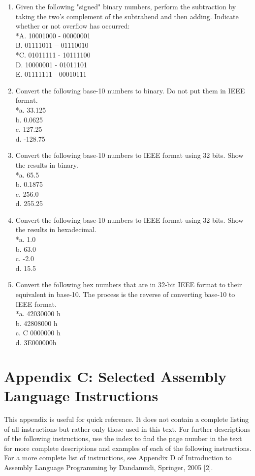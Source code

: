 \documentclass[10pt]{article}
\begin{document}
\begin{enumerate}
  \item Given the following "signed" binary numbers, perform the subtraction by taking the two's complement of the subtrahend and then adding. Indicate whether or not overflow has occurred:\\
*A. 10001000 - 00000001\\
B. $01111011-01110010$\\
*C. 01011111 - 10111100\\
D. 10000001 - 01011101\\
E. 01111111 - 00010111
  \item Convert the following base-10 numbers to binary. Do not put them in IEEE format.\\
*a. 33.125\\
b. 0.0625\\
c. 127.25\\
d. -128.75
  \item Convert the following base-10 numbers to IEEE format using 32 bits. Show the results in binary.\\
*a. 65.5\\
b. 0.1875\\
c. 256.0\\
d. 255.25
  \item Convert the following base-10 numbers to IEEE format using 32 bits. Show the results in hexadecimal.\\
*a. 1.0\\
b. 63.0\\
c. -2.0\\
d. 15.5
  \item Convert the following hex numbers that are in 32-bit IEEE format to their equivalent in base-10. The process is the reverse of converting base-10 to IEEE format.\\
*a. 42030000 h\\
b. 42808000 h\\
c. C 0000000 h\\
d. 3E000000h
\end{enumerate}

\section*{Appendix C: Selected Assembly Language Instructions}
This appendix is useful for quick reference. It does not contain a complete listing of all instructions but rather only those used in this text. For further descriptions of the following instructions, use the index to find the page number in the text for more complete descriptions and examples of each of the following instructions. For a more complete list of instructions, see Appendix D of Introduction to Assembly Language Programming by Dandamudi, Springer, 2005 [2].
\end{document}
